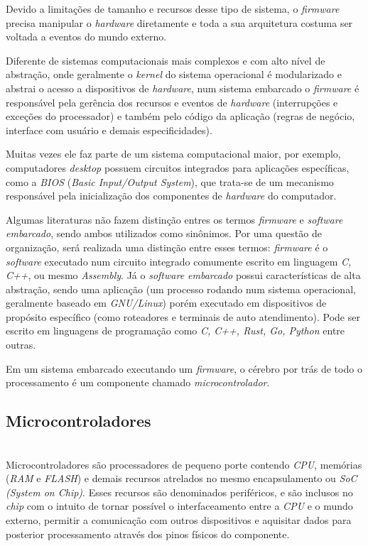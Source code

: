 \documentclass[times, twoside, watermark]{artigo}
\begin{document}
Devido a limitações de tamanho e recursos desse tipo de sistema, 
o \textit{firmware} precisa manipular o \textit{hardware} diretamente e toda a sua
 arquitetura costuma ser voltada a eventos do mundo externo.

Diferente de sistemas computacionais mais complexos e com alto nível de abstração,
onde geralmente o \textit{kernel} do sistema operacional é modularizado e abstrai
o acesso a dispositivos de \textit{hardware},
num sistema embarcado o \textit{firmware} é responsável pela gerência dos recursos 
e eventos de \textit{hardware} (interrupções e exceções do processador) e também
pelo código da aplicação (regras de negócio, interface com usuário e demais especificidades).

Muitas vezes ele faz parte de um sistema computacional maior,
por exemplo, computadores \textit{desktop} possuem circuitos integrados para 
aplicações específicas, como a \textit{BIOS} (\textit{Basic Input/Output System}),
que trata-se de um mecanismo responsável pela inicialização dos
componentes de \textit{hardware} do computador. \cite{terzicbasic}

Algumas literaturas não fazem distinção entres os termos \textit{firmware} e 
\textit{software embarcado}, sendo ambos utilizados como sinônimos. Por uma
questão de organização, será realizada uma distinção entre
esses termos: \textit{firmware} é o \textit{software} executado num circuito 
integrado comumente escrito em linguagem \textit{C, C++}, ou mesmo \textit{Assembly}. 
Já o \textit{software embarcado} possui características de alta abstração, 
sendo uma aplicação (um processo rodando num sistema operacional, 
geralmente baseado em \textit{GNU/Linux}) porém executado em dispositivos de 
propósito específico (como roteadores e terminais de auto atendimento). 
Pode ser escrito em linguagens de programação como \textit{C, C++, Rust, Go, Python} entre outras.

Em um sistema embarcado executando um \textit{firmware}, o cérebro por trás de todo o 
processamento é um componente chamado \textit{microcontrolador}.


\subsection{Microcontroladores}\hfill\\

Microcontroladores são processadores de pequeno porte contendo \textit{CPU}, 
memórias (\textit{RAM} e \textit{FLASH}) e demais
recursos atrelados no mesmo encapsulamento ou \textit{SoC (System on Chip)}.
Esses recursos são denominados periféricos, e são inclusos no \textit{chip} 
com o intuito de tornar possível o interfaceamento entre a \textit{CPU} 
e o mundo externo, permitir a comunicação com outros dispositivos e 
aquisitar dados para posterior processamento através dos pinos físicos do componente.
\end{document}
